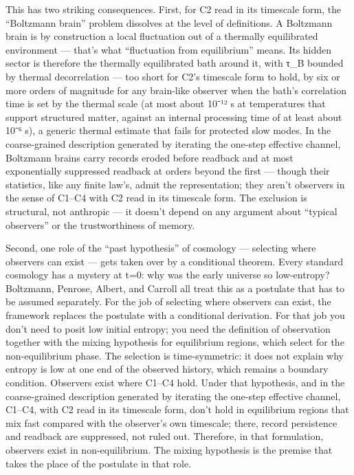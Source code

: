 \documentclass[
]{article}
\begin{document}
This has two striking consequences. First, for C2 read in its timescale
form, the ``Boltzmann brain'' problem dissolves at the level of
definitions. A Boltzmann brain is by construction a local fluctuation
out of a thermally equilibrated environment --- that's what
``fluctuation from equilibrium'' means. Its hidden sector is therefore
the thermally equilibrated bath around it, with τ\_B bounded by thermal
decorrelation --- too short for C2's timescale form to hold, by six or
more orders of magnitude for any brain-like observer when the bath's
correlation time is set by the thermal scale (at most about 10⁻¹² s at
temperatures that support structured matter, against an internal
processing time of at least about 10⁻⁶ s), a generic thermal estimate
that fails for protected slow modes. In the coarse-grained description
generated by iterating the one-step effective channel, Boltzmann brains
carry records eroded before readback and at most exponentially
suppressed readback at orders beyond the first --- though their
statistics, like any finite law's, admit the representation; they aren't
observers in the sense of C1--C4 with C2 read in its timescale form. The
exclusion is structural, not anthropic --- it doesn't depend on any
argument about ``typical observers'' or the trustworthiness of memory.

Second, one role of the ``past hypothesis'' of cosmology --- selecting
where observers can exist --- gets taken over by a conditional theorem.
Every standard cosmology has a mystery at t=0: why was the early
universe so low-entropy? Boltzmann, Penrose, Albert, and Carroll all
treat this as a postulate that has to be assumed separately. For the job
of selecting where observers can exist, the framework replaces the
postulate with a conditional derivation. For that job you don't need to
posit low initial entropy; you need the definition of observation
together with the mixing hypothesis for equilibrium regions, which
select for the non-equilibrium phase. The selection is time-symmetric:
it does not explain why entropy is low at one end of the observed
history, which remains a boundary condition. Observers exist where
C1--C4 hold. Under that hypothesis, and in the coarse-grained
description generated by iterating the one-step effective channel,
C1--C4, with C2 read in its timescale form, don't hold in equilibrium
regions that mix fast compared with the observer's own timescale; there,
record persistence and readback are suppressed, not ruled out.
Therefore, in that formulation, observers exist in non-equilibrium. The
mixing hypothesis is the premise that takes the place of the postulate
in that role.
\end{document}
